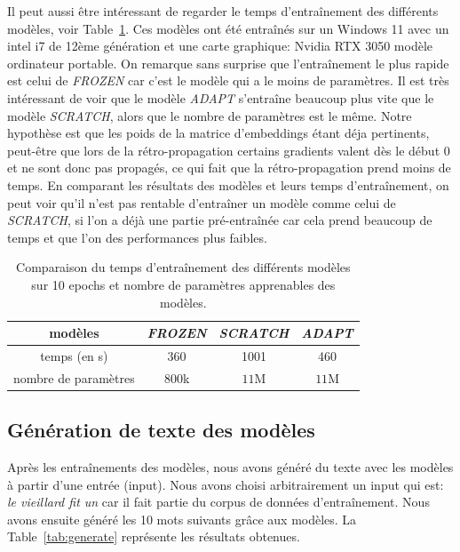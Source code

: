 \documentclass[a4paper]{article}
\begin{document}
Il peut aussi être intéressant de regarder le temps d'entraînement des différents modèles, voir Table~\ref{tab:times}. Ces modèles ont été
entraînés sur un Windows 11 avec un intel i7 de 12ème génération et une carte graphique: Nvidia RTX 3050 modèle ordinateur portable.
On remarque sans surprise que l'entraînement le plus rapide est celui de \textit{FROZEN} car c'est le modèle qui a le moins de paramètres.
Il est très intéressant de voir que le modèle \textit{ADAPT} s'entraîne beaucoup plus vite que le modèle \textit{SCRATCH}, alors que le
nombre de paramètres est le même. Notre hypothèse est que les poids de la matrice d'embeddings étant déja pertinents, peut-être que lors 
de la rétro-propagation certains gradients valent dès le début 0 et ne sont donc pas propagés, ce qui fait que la rétro-propagation prend 
moins de temps.
En comparant les résultats des modèles et leurs temps d'entraînement, on peut voir qu'il n'est pas rentable d'entraîner un modèle comme
celui de \textit{SCRATCH}, si l'on a déjà une partie pré-entraînée car cela prend beaucoup de temps et que l'on des performances 
plus faibles.

\begin{table}[ht]
    \centering
    \begin{tabular}{|c|c|c|c|}
        \hline
        modèles & \textit{FROZEN} & \textit{SCRATCH} & \textit{ADAPT} \\
        \hline
        temps (en s) & 360 & 1001 & 460 \\
        \hline
        nombre de paramètres & $800$k & $11$M & $11$M \\
        \hline
    \end{tabular}
    \caption{Comparaison du temps d'entraînement des différents modèles sur 10 epochs et nombre de paramètres apprenables des modèles.}
    \label{tab:times}
\end{table}

\subsection{Génération de texte des modèles}

Après les entraînements des modèles, nous avons généré du texte avec les modèles à partir d'une entrée (input). Nous avons choisi
arbitrairement un input qui est: \textit{le vieillard fit un} car il fait partie du corpus de données d'entraînement.
Nous avons ensuite généré les 10 mots suivants grâce aux modèles. La Table~\ref{tab:generate} représente les résultats obtenues. 
\end{document}
